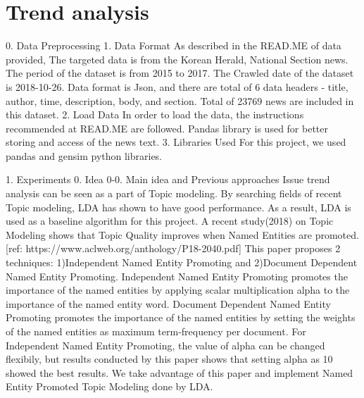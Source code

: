 \section{Trend analysis}
0. Data Preprocessing
1. Data Format
As described in the READ.ME of data provided, The targeted data is from the Korean Herald, National Section news. The period of the dataset is from 2015 to 2017. The Crawled date of the dataset is 2018-10-26. Data format is Json, and there are total of 6 data headers - title, author, time, description, body, and section. Total of 23769 news are included in this dataset.
2. Load Data
In order to load the data, the instructions recommended at READ.ME are followed. Pandas library is used for better storing and access of the news text.
3. Libraries Used
For this project, we used pandas and gensim python libraries.


1.
Experiments
0. Idea
0-0. Main idea and Previous approaches
Issue trend analysis can be seen as a part of Topic modeling. By searching fields of recent Topic modeling, LDA has shown to have good performance. As a result, LDA is used as a baseline algorithm for this project.
A recent study(2018) on Topic Modeling shows that Topic Quality improves when Named Entities are promoted.[ref: https://www.aclweb.org/anthology/P18-2040.pdf] This paper proposes 2 techniques: 1)Independent Named Entity Promoting and 2)Document Dependent Named Entity Promoting. Independent Named Entity Promoting promotes the importance of the named entities by applying scalar multiplication alpha to the importance of the named entity word. Document Dependent Named Entity Promoting promotes the importance of the named entities by setting the weights of the named entities as maximum term-frequency per document. For Independent Named Entity Promoting, the value of alpha can be changed flexibily, but results conducted by this paper shows that setting alpha as 10 showed the best results.
We take advantage of this paper and implement Named Entity Promoted Topic Modeling done by LDA.

